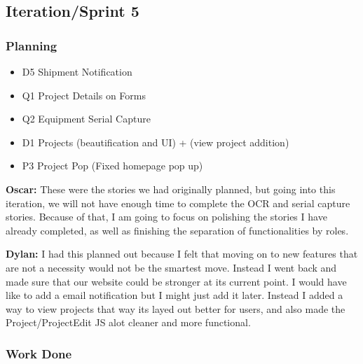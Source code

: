 \documentclass{article}
\begin{document}
\subsection{Iteration/Sprint 5}
\subsubsection{Planning}

\begin{itemize}
    \item D5 Shipment Notification 
    \item Q1 Project Details on Forms 
    \item Q2 Equipment Serial Capture 
    \item D1 Projects (beautification and UI) + (view project addition)
    \item P3 Project Pop (Fixed homepage pop up)
\end{itemize}

\textbf{Oscar:} These were the stories we had originally planned, but going into this iteration, we will not have enough time to complete the OCR and serial capture stories. Because of that, I am going to focus on polishing the stories I have already completed, as well as finishing the separation of functionalities by roles.

\textbf{Dylan:} I had this planned out because I felt that moving on to new features that are not a necessity would not be the smartest move. Instead I went back and made sure that our website could be stronger at its current point. I would have like to add a email notification but I might just add it later. Instead I added a way to view projects that way its layed out better for users, and also made the Project/ProjectEdit JS alot cleaner and more functional.

\subsubsection{Work Done}
\end{document}
